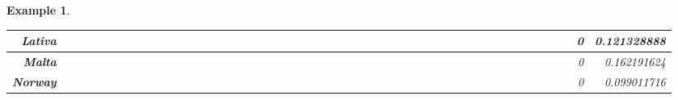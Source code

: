 \documentclass[a4paper,11pt]{report}
\newtheorem{example}[theorem]{Example}
\begin{document}
\begin{example}
\begin{appendices}
\begin{landscape}
\begin{longtable}{r|r|r|r|r|r|r|r|r|r|r|r|r|r|r|r|r|r|r|r|r|r|r|r|r|r|r|r|r|r|r|r|r|r|r|r|r|r|r|r|r|r|r|r|r|r|r|r|}
\multicolumn{1}{|r|}{\textbf{Lativa}}                &                  &                  &                  &                     &                  &                  &                                &                   &                  &                 &                  &                  &                           &                  &                 &                  &                  &                 &                  &                  &                  &                 &                &                 &                    &                &                  &                 &                 &                   &                  &                 &                     &                 &                   &                   &                &                 &                      &                          &                 &                  &                         &                 &                & 0                        & 0.121328888        \\ \hline
\multicolumn{1}{|r|}{\textbf{Malta}}                 &                  &                  &                  &                     &                  &                  &                                &                   &                  &                 &                  &                  &                           &                  &                 &                  &                  &                 &                  &                  &                  &                 &                &                 &                    &                &                  &                 &                 &                   &                  &                 &                     &                 &                   &                   &                &                 &                      &                          &                 &                  &                         &                 &                & 0                        & 0.162191624        \\ \hline
\multicolumn{1}{|r|}{\textbf{Norway}}                &                  &                  &                  &                     &                  &                  &                                &                   &                  &                 &                  &                  &                           &                  &                 &                  &                  &                 &                  &                  &                  &                 &                &                 &                    &                &                  &                 &                 &                   &                  &                 &                     &                 &                   &                   &                &                 &                      &                          &                 &                  &                         &                 &                & 0                        & 0.099011716        \\ \hline

\end{longtable}
\end{landscape}
\end{appendices}
\end{example}
\end{document}
